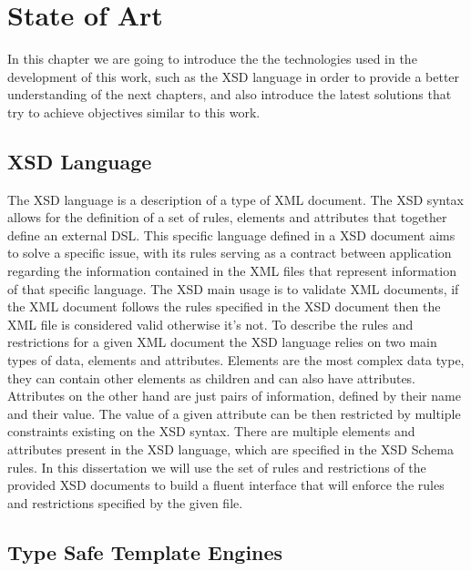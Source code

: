 \chapter{State of Art}
\label{cha:stateofart}

In this chapter we are going to introduce the the technologies used in the development of this work, such as the \ac{XSD} language in order to provide a better understanding of the next chapters, and also introduce the latest solutions that try to achieve objectives similar to this work. 

\section{XSD Language} %
\label{sec:xsd}

The \ac{XSD} language is a description of a type of \ac{XML} document. The \ac{XSD} syntax allows for the definition of a set of rules, elements and attributes that together define an external \ac{DSL}. This specific language defined in a \ac{XSD} document aims to solve a specific issue, with its rules serving as a contract between application regarding the information contained in the \ac{XML} files that represent information of that specific language. The \ac{XSD} main usage is to validate \ac{XML} documents, if the \ac{XML} document follows the rules specified in the \ac{XSD} document then the \ac{XML} file is considered valid otherwise it's not. To describe the rules and restrictions for a given \ac{XML} document the \ac{XSD} language relies on two main types of data, elements and attributes. Elements are the most complex data type, they can contain other elements as children and can also have attributes. Attributes on the other hand are just pairs of information, defined by their name and their value. The value of a given attribute can be then restricted by multiple constraints existing on the \ac{XSD} syntax. There are multiple elements and attributes present in the \ac{XSD} language, which are specified in the \ac{XSD} Schema rules\cite{xsdrules}. In this dissertation we will use the set of rules and restrictions of the provided \ac{XSD} documents to build a fluent interface that will enforce the rules and restrictions specified by the given file.

\section{Type Safe Template Engines}
\label{sec:typesafetemplateengines}

